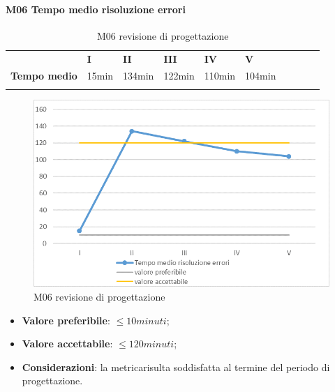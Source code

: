 \paragraph{M06 Tempo medio risoluzione errori} \mbox{}
\begin{longtable}[H!] {						
		>{}p{38mm}  		
		>{}p{12mm}
		>{}p{12mm}		
		>{}p{12mm}		
		>{}p{12mm}		
		>{}p{12mm}		
		>{}p{12mm}
		>{}p{12mm}
		>{}p{12mm}
		>{}p{12mm}
	}
	\rowcolor{gray!50}
	\textbf{} & \textbf{I} & \textbf{II} & \textbf{III} & \textbf{IV} & \textbf{V} \TBstrut \\ [2mm]
	\textbf{Tempo medio} & 15min & 134min & 122min & 110min & 104min \TBstrut \\ [2mm]
	\rowcolor{white}
	\caption{M06 revisione di progettazione\glo}
\end{longtable}
\begin{figure}[H] 	
\includegraphics[width=\linewidth]{./img/grafici/RP12.png}	
\caption{M06 revisione di progettazione\glo}	
\end{figure}
\begin{itemize}
	\item \textbf{Valore preferibile}: $\le10minuti$;
	\item \textbf{Valore accettabile}: $\le120minuti$;
	\item \textbf{Considerazioni}: la metrica\glosp risulta soddisfatta al termine del periodo di progettazione\glo.
\end{itemize}
